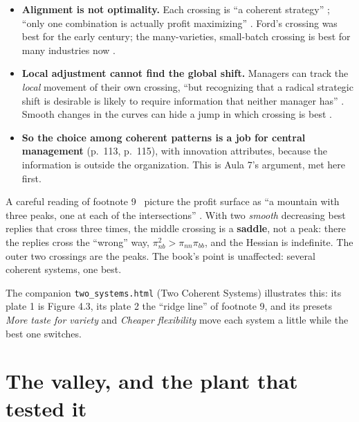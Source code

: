 \begin{itemize}
  \item \textbf{Alignment is not optimality.} Each crossing is ``a coherent strategy'' ;
    ``only one combination is actually profit maximizing'' . Ford's crossing was best for
    the early century; the many-varieties, small-batch crossing is best for many industries now
    .
  \item \textbf{Local adjustment cannot find the global shift.} Managers can track the
    \emph{local} movement of their own crossing, ``but recognizing that a radical strategic shift is
    desirable is likely to require information that neither manager has'' . Smooth changes
    in the curves can hide a jump in which crossing is best .
  \item \textbf{So the choice among coherent patterns is a job for central management} (p.~113,
    p.~115), with innovation attributes, because the information is outside the organization. This
    is Aula 7's argument, met here first.
\end{itemize}

\begin{caution}{A careful reading of footnote 9}
\MR\ picture the profit surface as ``a mountain with three peaks, one at each of the
intersections'' . With two \emph{smooth} decreasing best replies that cross three times,
the middle crossing is a \textbf{saddle}, not a peak: there the replies cross the ``wrong'' way,
$\pi_{nb}^2 > \pi_{nn}\pi_{bb}$, and the Hessian is indefinite. The outer two crossings are the
peaks. The book's point is unaffected: several coherent systems, one best.
\end{caution}

\begin{keyidea}
The companion \texttt{two\_systems.html} (Two Coherent Systems) illustrates this: its plate 1 is
Figure 4.3, its plate 2 the ``ridge line'' of footnote 9, and its presets \emph{More taste for
variety} and \emph{Cheaper flexibility} move each system a little while the best one switches.
\end{keyidea}

\section{The valley, and the plant that tested it}\label{sec:a1-valley}

